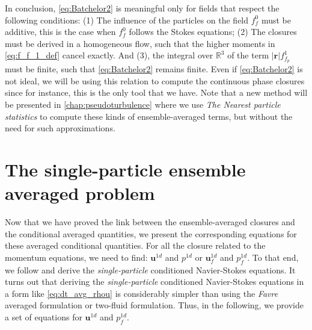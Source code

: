 In conclusion, \ref{eq:Batchelor2}  is meaningful only for fields that respect the following conditions: 
(1) The influence of the particles on the field $f_f^0$ must be additive, this is the case when ${f_f^0}$ follows the Stokes equations; 
(2) The closures must be derived in a homogeneous flow, such that the higher moments in \ref{eq:f_f_1_def} cancel exactly. 
And (3), the integral over $\mathbb{R}^3$ of the term $|\textbf{r}| f_{f_p}^1$ must be finite, such that \ref{eq:Batchelor2} remains finite. 
Even if \ref{eq:Batchelor2} is not ideal, we will be using this relation to compute the continuous phase closures since for instance, this is the only tool that we have. 
Note that a new method will be presented in \ref{chap:pseudoturbulence} where we use \textit{The Nearest particle statistics} \citep{zhang2021ensemble} to compute these kinds of ensemble-averaged terms, but without the need for such approximations.


\section{The single-particle ensemble averaged problem}
\label{sec:the_disturbance_eq}

Now that we have proved the link between the ensemble-averaged closures and the conditional averaged quantities, we present the corresponding equations for these averaged conditional quantities. 
For all the closure related to the momentum equations, we need to find: $\textbf{u}^{1d}$ and $p^{1d}$ or $\textbf{u}^{1d}_f$ and $p^{1d}_f$. 
To that end, we follow \citep{zhang1994averaged,hinch1977averaged} and derive the \textit{single-particle} conditioned Navier-Stokes equations.
It turns out that deriving the \textit{single-particle} conditioned Navier-Stokes equations in a form like \ref{eq:dt_avg_rhou} is considerably simpler than using the \textit{Favre} averaged formulation or two-fluid formulation. 
Thus, in the following, we provide a set of equations for $\textbf{u}^{1d}$ and $p_f^{1d}$. 

